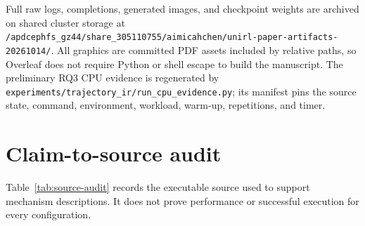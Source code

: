 \documentclass[10pt]{article}
\newcommand{\codepath}[1]{\texttt{#1}}
\begin{document}
Full raw logs, completions, generated images, and checkpoint weights are archived on shared cluster storage at \codepath{/apdcephfs\_gz44/share\_305110755/aimicahchen/unirl-paper-artifacts-20261014/}.
All graphics are committed PDF assets included by relative paths, so Overleaf does not require Python or shell escape to build the manuscript.
The preliminary RQ3 CPU evidence is regenerated by
\codepath{experiments/trajectory\_ir/run\_cpu\_evidence.py}; its manifest pins the
source state, command, environment, workload, warm-up, repetitions, and timer.




\appendix

\section{Claim-to-source audit}
\label{app:source-audit}

Table~\ref{tab:source-audit} records the executable source used to support mechanism descriptions.
It does not prove performance or successful execution for every configuration.
\end{document}
